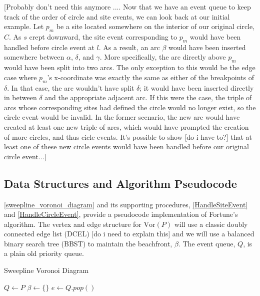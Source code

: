 \documentclass[12pt,twoside]{reedthesis}
\begin{document}
 [Probably don't need this anymore .... Now that we have an event queue to keep track of the order of circle and site events, we can look back at our initial example. Let $p_{m}$ be a site located somewhere on the interior of our original circle, $C$. As $s$ crept downward, the site event corresponding to $p_{m}$ would have been handled before circle event at $l$. As a result, an arc $\beta$ would have been inserted somewhere between $\alpha$, $\delta$, and $\gamma$. More specifically, the arc directly above $p_{m}$ would have been split into two arcs. The only exception to this would be the edge case where $p_{m}$'s x-coordinate was exactly the same as either of the breakpoints of $\delta$. In that case, the arc wouldn't have split $\delta$; it would have been inserted directly in between $\delta$ and the appropriate adjacent arc. If this were the case, the triple of arcs whose corresponding sites had defined the circle would no longer exist, so the circle event would be invalid. In the former scenario, the new arc would have created at least one new triple of arcs, which would have prompted the creation of more circles, and thus cicle events. It's possible to show [do i have to?] that at least one of these new circle events would have been handled before our original circle event...]

  \subsection{Data Structures and Algorithm Pseudocode} %
  \label{sub:sweep_algorithm_pseudocode}
  \cref{sweepline_voronoi_diagram} and its supporting procedures, \cref{HandleSiteEvent} and \cref{HandleCircleEvent}, provide a pseudocode implementation of Fortune's algorithm. The vertex and edge structure for $\mbox{Vor}(P)$ will use a classic doubly connected edge list (DCEL) [do i need to explain this] and we will use a balanced binary search tree (BBST) to maintain the beachfront, $\beta$. The event queue, $Q$, is a plain old priority queue.  
  
  \begin{algorithm}[H]
  \begin{algorithmic}[1]
  \caption{Sweepline Voronoi Diagram}\label{sweepline_voronoi_diagram}
  \State $Q\gets P$
  \State $\beta\gets \{\}$
    \State $e\gets Q.pop()$
    \State{}
    \Else
    \State{}
    \EndIf
  \EndWhile
  \EndProcedure
  \end{algorithmic} 
  \end{algorithm}
\end{document}
